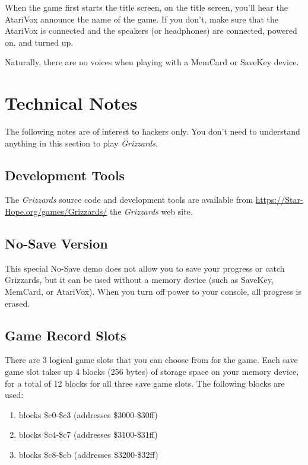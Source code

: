 \documentclass[10pt,twocolumn,openany,article]{memoir}
\begin{document}
\begin{description}
When the game first starts the title screen, on the title screen, you'll
hear the AtariVox announce the name of the game. If you don't, make sure
that  the AtariVox  is connected  and the  speakers (or  headphones) are
connected, powered on, and turned up.

Naturally,  there  are  no  voices   when  playing  with  a  MemCard  or
SaveKey device.

\fi

\chapter{Technical Notes}

The following notes are of interest to hackers only. You don't need to
understand anything in this section to play \textit{Grizzards}.

\section{Development Tools}

The \textit{Grizzards} source code and development tools are available from
\href{https://Star-Hope.org/games/Grizzards/}{https://Star-Hope\-.org/\-games/\-Grizzards/} 
the \textit{Grizzards} web site.

\ifdefined\NOSAVE

\section{No-Save Version}

This special  No-Save demo does not  allow you to save  your progress or
catch Grizzards,  but it can  be used without  a memory device  (such as
SaveKey, MemCard, or AtariVox). When you turn off power to your console,
all progress is erased.

\else

\section{Game Record Slots}

There are 3  logical game slots that  you can choose from  for the game.
Each save game  slot takes up 4  blocks (256 bytes) of  storage space on
your memory  device, for a  total of 12 blocks  for all three  save game
slots. The following blocks are used:

\ifdefined\DEMO

\begin{enumerate}
\item blocks \$c0-\$c3 (addresses \$3000-\$30ff)
\item blocks \$c4-\$c7 (addresses \$3100-\$31ff)
\item blocks \$c8-\$cb (addresses \$3200-\$32ff)
\end{enumerate}


\end{description}
\end{document}
